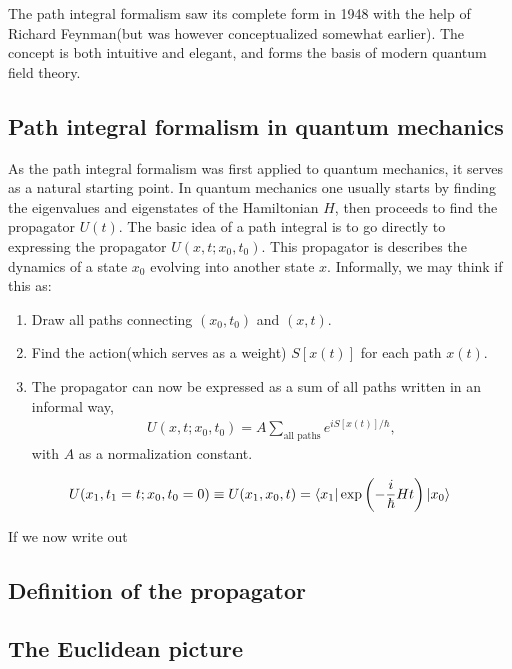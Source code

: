 The path integral formalism saw its complete form in 1948 with the help of Richard Feynman\cite{RevModPhys.20.367}(but was however conceptualized somewhat earlier). The concept is both intuitive and elegant, and forms the basis of modern quantum field theory.

\subsection{Path integral formalism in quantum mechanics}
As the path integral formalism was first applied to quantum mechanics, it serves as a natural starting point. In quantum mechanics one usually starts by finding the eigenvalues and eigenstates of the Hamiltonian $H$, then proceeds to find the propagator $U(t)$. The basic idea of a path integral is to go directly to expressing the propagator $U(x,t;x_0,t_0)$. This propagator is describes the dynamics of a state $x_0$ evolving into another state $x$. Informally, we may think if this as:

\begin{enumerate}
	\item Draw all paths connecting $(x_0,t_0)$ and $(x,t)$.
	\item Find the action(which serves as a weight) $S[x(t)]$ for each path $x(t)$.
	\item The propagator can now be expressed as a sum of all paths written in an informal way,
	\begin{align*}
		U(x,t;x_0,t_0) = A \sum_\text{all paths} e^{iS[x(t)]/\hbar},
	\end{align*}
	with $A$ as a normalization constant.
\end{enumerate}

\begin{align}
	U(x_1,t_1=t;x_0,t_0=0) \equiv U(x_1,x_0,t) = \langle{x_1}| \exp \left( -\frac{i}{\hbar} H t \right) |{x_0}\rangle
	\label{eq:propagator-definition-qm}
\end{align}

If we now write out 



\subsection{Definition of the propagator}

\subsection{The Euclidean picture}

